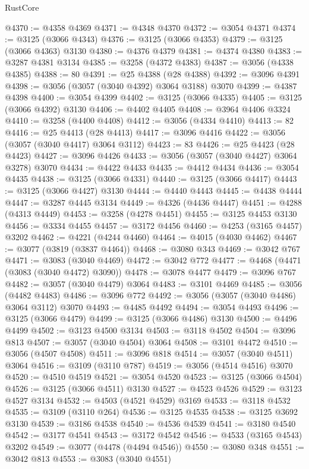 \begin{lexlean}{RustCore}
\begin{coremodule}
@4370 := @4358 @4369
@4371 := @4348 @4370
@4372 := @3054 @4371
@4374 := @3125 (@3066 @4343)
@4376 := @3125 (@3066 @4353)
@4379 := @3125 (@3066 @4363) @3130
@4380 := @4376 @4379
@4381 := @4374 @4380
@4383 := @3287 @4381 @3134
@4385 := @3258 (@4372 @4383)
@4387 := @3056 (@4338 @4385)
@4388 := 80
@4391 := @25 @4388 (@28 @4388)
@4392 := @3096 @4391
@4398 := @3056 (@3057 (@3040 @4392) @3064 @3188) @3070
@4399 := @4387 @4398
@4400 := @3054 @4399
@4402 := @3125 (@3066 @4335)
@4405 := @3125 (@3066 @4392) @3130
@4406 := @4402 @4405
@4408 := @3964 @4406 @3324
@4410 := @3258 (@4400 @4408)
@4412 := @3056 (@4334 @4410)
@4413 := 82
@4416 := @25 @4413 (@28 @4413)
@4417 := @3096 @4416
@4422 := @3056 (@3057 (@3040 @4417) @3064 @3112)
@4423 := 83
@4426 := @25 @4423 (@28 @4423)
@4427 := @3096 @4426
@4433 := @3056 (@3057 (@3040 @4427) @3064 @3278) @3070
@4434 := @4422 @4433
@4435 := @4412 @4434
@4436 := @3054 @4435
@4438 := @3125 (@3066 @4331)
@4440 := @3125 (@3066 @4417)
@4443 := @3125 (@3066 @4427) @3130
@4444 := @4440 @4443
@4445 := @4438 @4444
@4447 := @3287 @4445 @3134
@4449 := @4326 (@4436 @4447)
@4451 := @4288 (@4313 @4449)
@4453 := @3258 (@4278 @4451)
@4455 := @3125 @4453 @3130
@4456 := @3334 @4455
@4457 := @3172 @4456
@4460 := @4253 (@3165 @4457) @3202
@4462 := @4221 (@4244 @4460)
@4464 := @4015 (@4030 @4462)
@4467 := @3077 (@3819 (@3837 @4464))
@4468 := @3080 @343
@4469 := @3042 @767
@4471 := @3083 (@3040 @4469)
@4472 := @3042 @772
@4477 := @4468 (@4471 (@3083 (@3040 @4472) @3090))
@4478 := @3078 @4477
@4479 := @3096 @767
@4482 := @3057 (@3040 @4479) @3064
@4483 := @3101 @4469
@4485 := @3056 (@4482 @4483)
@4486 := @3096 @772
@4492 := @3056 (@3057 (@3040 @4486) @3064 @3112) @3070
@4493 := @4485 @4492
@4494 := @3054 @4493
@4496 := @3125 (@3066 @4479)
@4499 := @3125 (@3066 @4486) @3130
@4500 := @4496 @4499
@4502 := @3123 @4500 @3134
@4503 := @3118 @4502
@4504 := @3096 @813
@4507 := @3057 (@3040 @4504) @3064
@4508 := @3101 @4472
@4510 := @3056 (@4507 @4508)
@4511 := @3096 @818
@4514 := @3057 (@3040 @4511) @3064
@4516 := @3109 (@3110 @787)
@4519 := @3056 (@4514 @4516) @3070
@4520 := @4510 @4519
@4521 := @3054 @4520
@4523 := @3125 (@3066 @4504)
@4526 := @3125 (@3066 @4511) @3130
@4527 := @4523 @4526
@4529 := @3123 @4527 @3134
@4532 := @4503 (@4521 @4529) @3169
@4533 := @3118 @4532
@4535 := @3109 (@3110 @264)
@4536 := @3125 @4535
@4538 := @3125 @3692 @3130
@4539 := @3186 @4538
@4540 := @4536 @4539
@4541 := @3180 @4540
@4542 := @3177 @4541
@4543 := @3172 @4542
@4546 := @4533 (@3165 @4543) @3202
@4549 := @3077 (@4478 (@4494 @4546))
@4550 := @3080 @348
@4551 := @3042 @813
@4553 := @3083 (@3040 @4551)

\end{coremodule}
\end{lexlean}

